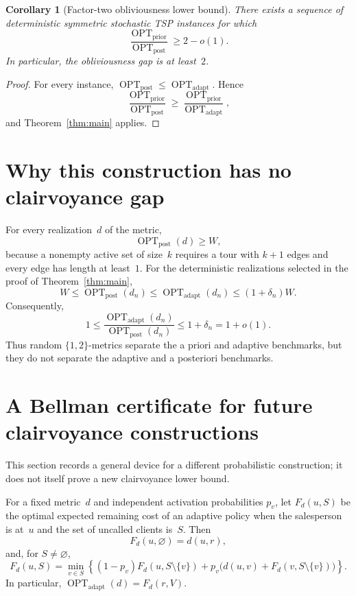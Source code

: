 \documentclass[11pt]{article}
\newtheorem{corollary}[theorem]{Corollary}
\theoremstyle{remark}
\newcommand{\optpost}{\operatorname{OPT}_{\mathrm{post}}}
\newcommand{\optadapt}{\operatorname{OPT}_{\mathrm{adapt}}}
\newcommand{\optprior}{\operatorname{OPT}_{\mathrm{prior}}}
\begin{document}
\begin{corollary}[Factor-two obliviousness lower bound]
There exists a sequence of deterministic symmetric stochastic TSP instances
for which
\[
    \frac{\optprior}{\optpost}\geq 2-o(1).
\]
In particular, the obliviousness gap is at least~$2$.
\end{corollary}

\begin{proof}
For every instance, $\optpost\leq\optadapt$.  Hence
\[
    \frac{\optprior}{\optpost}
    \geq
    \frac{\optprior}{\optadapt},
\]
and Theorem~\ref{thm:main} applies.
\end{proof}

\section{Why this construction has no clairvoyance gap}

For every realization~$d$ of the metric,
\[
    \optpost(d)\geq W,
\]
because a nonempty active set of size~$k$ requires a tour with $k+1$ edges and
every edge has length at least~$1$.  For the deterministic realizations selected
in the proof of Theorem~\ref{thm:main},
\[
    W\leq\optpost(d_n)\leq\optadapt(d_n)\leq(1+\delta_n)W.
\]
Consequently,
\[
    1\leq
    \frac{\optadapt(d_n)}{\optpost(d_n)}
    \leq 1+\delta_n
    =1+o(1).
\]
Thus random $\{1,2\}$-metrics separate the a priori and adaptive benchmarks,
but they do not separate the adaptive and a posteriori benchmarks.

\section{A Bellman certificate for future clairvoyance constructions}

This section records a general device for a different probabilistic
construction; it does not itself prove a new clairvoyance lower bound.

For a fixed metric~$d$ and independent activation probabilities $p_v$, let
$F_d(u,S)$ be the optimal expected remaining cost of an adaptive policy when the
salesperson is at~$u$ and the set of uncalled clients is~$S$.  Then
\[
    F_d(u,\varnothing)=d(u,r),
\]
and, for $S\neq\varnothing$,
\begin{equation}\label{eq:bellman}
    F_d(u,S)
    =
    \min_{v\in S}
    \left\{
        (1-p_v)F_d(u,S\setminus\{v\})
        +p_v\bigl(d(u,v)+F_d(v,S\setminus\{v\})\bigr)
    \right\}.
\end{equation}
In particular, $\optadapt(d)=F_d(r,V)$.
\end{document}
